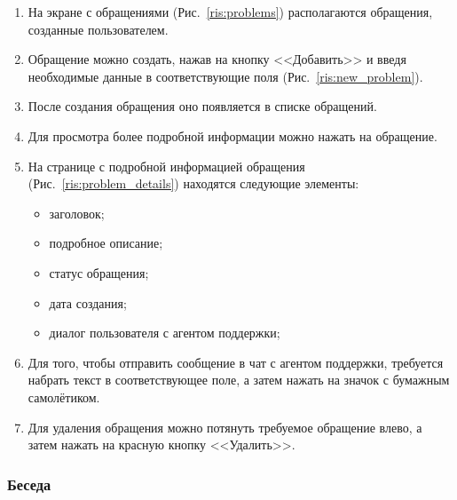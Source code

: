 \documentclass{../includes/TechDoc}
\begin{document}
    \begin{enumerate}
        \item На экране с обращениями (Рис.~\ref{ris:problems}) располагаются обращения, созданные пользователем.

        \item Обращение можно создать, нажав на кнопку <<Добавить>> и введя необходимые данные в соответствующие поля (Рис.~\ref{ris:new_problem}).

        \item После создания обращения оно появляется в списке обращений.
        \item Для просмотра более подробной информации можно нажать на обращение.
        \item На странице с подробной информацией обращения (Рис.~\ref{ris:problem_details}) находятся следующие элементы:
        \begin{itemize}
            \item заголовок;
            \item подробное описание;
            \item статус обращения;
            \item дата создания;
            \item диалог пользователя с агентом поддержки;
        \end{itemize}

        \item Для того, чтобы отправить сообщение в чат с агентом поддержки, требуется набрать текст
        в соответствующее поле, а затем нажать на значок с бумажным самолётиком.

        \item Для удаления обращения можно потянуть требуемое обращение влево, а затем нажать на красную кнопку <<Удалить>>.
    \end{enumerate}

    \clearpage

    \subsubsection{Беседа}
\end{document}
